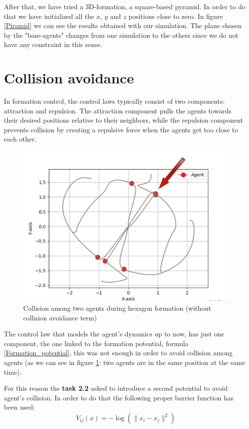 \documentclass[a4paper,11pt,oneside]{book}
\begin{document}
After that, we have tried a 3D-formation, a square-based pyramid. In order to do that we have initialized all the $x$, $y$ and $z$ positions close to zero. In figure \ref{Piramid} we can see the results obtained with our simulation. The plane chosen by the "base-agents" changes from one simulation to the others since we do not have any constraint in this sense.


\section{Collision avoidance}
In formation control, the control laws typically consist of two components: attraction and repulsion. The attraction component pulls the agents towards their desired positions relative to their neighbors, while the repulsion component prevents collision by creating a repulsive force when the agents get too close to each other.

\begin{figure}[h]
\centering
	\includegraphics[scale=0.25]{Collision.jpg}
	\caption{Collision among two agents during hexagon formation (without collision avoidance term)}
	\label{Collision}
\end{figure}

The control law that models the agent's dynamics up to now, has just one component, the one linked to the formation potential, formula \ref{Formation_potential}, this was not enough in order to avoid collision among agents (as we can see in figure \ref{Collision}: two agents are in the same position at the same time). 

\bigskip
For this reason the \textbf{task 2.2} asked to introduce a second potential to avoid agent's collision. In order to do that the following proper barrier function has been used:
\begin{equation}
V_{ij}(x) = - \log( \lVert x_i - x_j \rVert ^2)
\label{Collision_barrier}
\end{equation}
\end{document}
